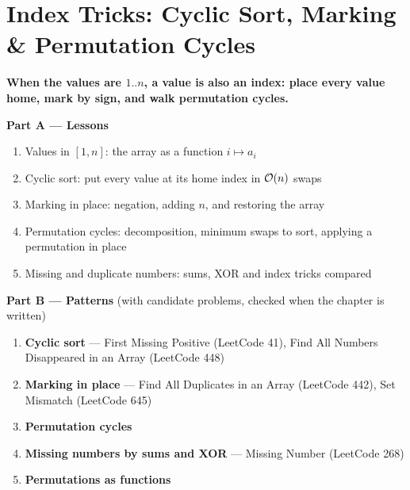 \chapter{Index Tricks: Cyclic Sort, Marking \& Permutation Cycles}
\label{ch:index_tricks}

\begin{tcolorbox}[enhanced, colback=white, colframe=secondaryblue, boxrule=1pt, arc=2mm]
\textbf{\large\textcolor{primaryblue}{When the values are $1..n$, a value is also an index: place every value home, mark by sign, and walk permutation cycles.}}
\end{tcolorbox}


\begin{plannedbox}
\textbf{Part A --- Lessons}
\begin{enumerate}[leftmargin=*, label=\textbf{A\arabic*.}, itemsep=1pt]
    \item Values in $[1, n]$: the array as a function $i \mapsto a_i$
    \item Cyclic sort: put every value at its home index in $\mathcal{O}(n)$ swaps
    \item Marking in place: negation, adding $n$, and restoring the array
    \item Permutation cycles: decomposition, minimum swaps to sort, applying a permutation in place
    \item Missing and duplicate numbers: sums, XOR and index tricks compared
\end{enumerate}
\textbf{Part B --- Patterns} (with candidate problems, checked when the chapter is written)
\begin{enumerate}[leftmargin=*, label=\textbf{P\arabic*.}, itemsep=1pt]
    \item \textbf{Cyclic sort} --- First Missing Positive {\small\color{darkgray}(LeetCode 41)}, Find All Numbers Disappeared in an Array {\small\color{darkgray}(LeetCode 448)}
    \item \textbf{Marking in place} --- Find All Duplicates in an Array {\small\color{darkgray}(LeetCode 442)}, Set Mismatch {\small\color{darkgray}(LeetCode 645)}
    \item \textbf{Permutation cycles}
    \item \textbf{Missing numbers by sums and XOR} --- Missing Number {\small\color{darkgray}(LeetCode 268)}
    \item \textbf{Permutations as functions}
\end{enumerate}
\end{plannedbox}
